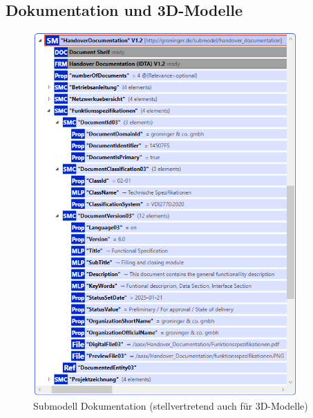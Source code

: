 \subsection{Dokumentation und 3D-Modelle}
\begin{figure}[H]
    \centering
    \includegraphics[width=0.9\textwidth]{Bilder/ErgebnissePackageExplorer/SMCDokumentation.PNG}
    \caption[Submodell Dokumentation]{Submodell Dokumentation (stellvertretend auch für 3D-Modelle)}
\end{figure}

\newpage
